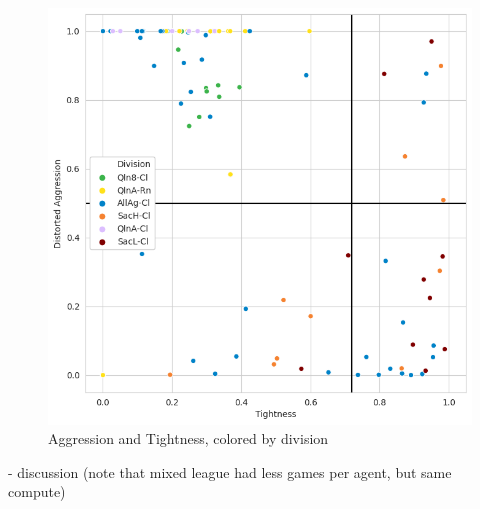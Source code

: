 \begin{figure}[H]
\centering
    \includegraphics[width=0.8\linewidth]{Results/figures/traditional_scatterplot_Division.png}
\caption{Aggression and Tightness, colored by division}
\label{AggTightDivision}
\end{figure}

\begin{code}
    - discussion (note that mixed league had less games per agent, but same compute)
\end{code}

